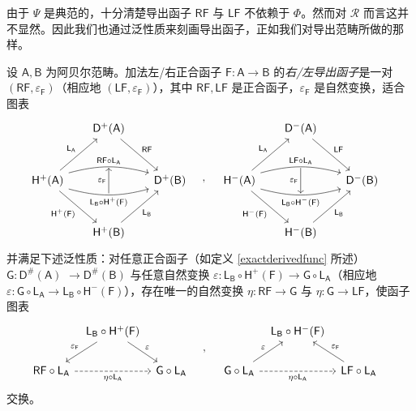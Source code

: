 由于 $\Psi$ 是典范的，十分清楚导出函子 $\mathsf{RF}$ 与 $\mathsf{LF}$ 不依赖于 $\Phi$。然而对 $\mathcal{R}$ 而言这并不显然。因此我们也通过泛性质来刻画导出函子，正如我们对导出范畴所做的那样。

\begin{Def}\label{universalderivedfunc}
	设 $\mathsf{A}, \mathsf{B}$ 为阿贝尔范畴。加法左/右正合函子 $\mathsf{F}:\mathsf{A}\rightarrow\mathsf{B}$ 的\textit{右/左导出函子}是一对 $(\mathsf{RF},\varepsilon_\mathsf{F})$（相应地 $(\mathsf{LF},\varepsilon_\mathsf{F})$），其中 $\mathsf{RF}, \mathsf{LF}$ 是正合函子，$\varepsilon_\mathsf{F}$ 是自然变换，适合图表
	\begin{equation}\label{derfuncdiag}
		\mkern-18mu
		\begin{tikzcd}[row sep=1cm, column sep=0.6cm]
			& \mathsf{D^+(A)}\arrow[dr, "\mathsf{RF}"] & \\
			\mathsf{H^+(A)}\arrow[ur, "\mathsf{L_A}"]\arrow[dr, "\mathsf{H^+(F)}"']\arrow[rr, yshift=0.5ex, out=15, in=165, "\mathsf{RF\circ L_A}"]\arrow[rr, yshift=-0.5ex, out=-15, in=195, "\mathsf{L_B\circ H^+(F)}"'] & & \mathsf{D^+(B)} \\
			& \mathsf{H^+(B)}\arrow[ur, "\mathsf{L_B}"']\arrow[uu, shorten=6ex, "\varepsilon_\mathsf{F}"] & 
		\end{tikzcd}\quad,\quad
		\begin{tikzcd}[row sep=1cm, column sep=0.6cm]
			& \mathsf{D^-(A)}\arrow[dr, "\mathsf{LF}"]\arrow[dd, shorten=6ex, "\varepsilon_\mathsf{F}"'] & \\
			\mathsf{H^-(A)}\arrow[ur, "\mathsf{L_A}"]\arrow[dr, "\mathsf{H^-(F)}"']\arrow[rr, yshift=0.5ex, out=15, in=165, "\mathsf{LF\circ L_A}"]\arrow[rr, yshift=-0.5ex, out=-15, in=195, "\mathsf{L_B\circ H^-(F)}"'] & & \mathsf{D^-(B)} \\
			& \mathsf{H^-(B)}\arrow[ur, "\mathsf{L_B}"'] & 
		\end{tikzcd}
	\end{equation}
	并满足下述泛性质：对任意正合函子（如定义 \ref{exactderivedfunc} 所述）$\mathsf{G}:\mathsf{D^\#\!(A)}$ $\rightarrow\mathsf{D^\#\!(B)}$ 与任意自然变换 $\varepsilon:\mathsf{L_B\circ H^+(F)}\rightarrow\mathsf{G\circ L_A}$（相应地 $\varepsilon:\mathsf{G\circ L_A}\rightarrow\mathsf{L_B\circ H^-(F)}$），存在唯一的自然变换 $\eta:\mathsf{RF}\rightarrow\mathsf{G}$ 与 $\eta:\mathsf{G}\rightarrow\mathsf{LF}$，使函子图表
	\begin{equation}\label{universalderfuncdiag}
		\mkern-18mu
		\begin{tikzcd}[column sep=0.2cm]
			& \mathsf{L_B\circ H^+(F)}\arrow[dl, "\varepsilon_\mathsf{F}"']\arrow[dr, "\varepsilon"] & \\
			\mathsf{RF\circ L_A}\arrow[rr, dashed, "\eta\circ\mathsf{L_A}"'] & & \mathsf{G\circ L_A}
		\end{tikzcd}\quad,\quad
		\begin{tikzcd}[column sep=0.2cm]
			& \mathsf{L_B\circ H^-(F)} & \\
			\mathsf{G\circ L_A}\arrow[ur, "\varepsilon"]\arrow[rr, dashed, "\eta\circ\mathsf{L_A}"'] & & \mathsf{LF\circ L_A}\arrow[ul, "\varepsilon_\mathsf{F}"']
		\end{tikzcd}
	\end{equation}
	交换。
\end{Def}


